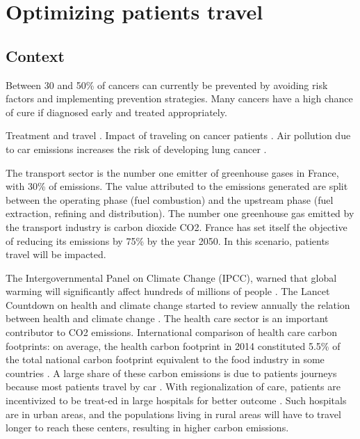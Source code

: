 \chapter{Optimizing patients travel}

\section{Context}

Between 30 and 50\% of cancers can currently be prevented by avoiding risk factors and implementing prevention strategies. Many cancers have a high chance of cure if diagnosed early and treated appropriately.

Treatment and travel \cite{weiss_global_2020,brundisini_chronic_2013,kelly_are_2016,salerno_understanding_2022}.
Impact of traveling on cancer patients \cite{payne_impact_2000,flytkjaer_virgilsen_cancer_2019,virgilsen_travel_2019,payne_impact_2000,ambroggi_distance_2015}.
Air pollution due to car emissions increases the risk of developing lung cancer \cite{raaschou-nielsen_air_2013}.

The transport sector is the number one emitter of greenhouse gases in France, with 30\% of emissions. The value attributed to the emissions generated are split between the operating phase (fuel combustion) and the upstream phase (fuel extraction, refining and distribution). The number one greenhouse gas emitted by the transport industry is carbon dioxide CO2.
France has set itself the objective of reducing its emissions by 75\% by the year 2050. In this scenario, patients travel will be impacted.

The Intergovernmental Panel on Climate Change (IPCC), warned that global warming will significantly affect hundreds of millions of people \cite{change_climate_2015}.
The Lancet Countdown on health and climate change started to review annually the relation between health and climate change \cite{watts_2020_2021}.
The health care sector is an important contributor to CO2 emissions. International comparison of health care carbon footprints: on average, the health carbon footprint in 2014 constituted 5.5\% of the total national carbon footprint equivalent to the food industry in some countries \cite{pichler_international_2019}.
A large share of these carbon emissions is due to patients journeys \cite{andrews_carbon_2013,nicolet_what_2022} because most patients travel by car \cite{forner_carbon_2021}. With regionalization of care, patients are incentivized to be treat-ed in large hospitals for better outcome \cite{eskander_health_2016}. Such hospitals are in urban areas, and the populations living in rural areas will have to travel longer to reach these centers, resulting in higher carbon emissions.

